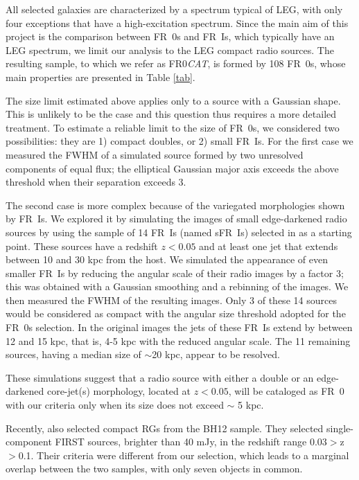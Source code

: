 \documentclass[traditabstract]{aa}
\newcommand{\FRo}{FR0{\sl{CAT}}}
\begin{document}
All selected galaxies are characterized by a spectrum typical of LEG,
with only four exceptions that have a high-excitation spectrum. Since
the main aim of this project is the comparison between FR~0s and
FR~Is, which typically have an LEG spectrum, we limit our analysis to
the LEG compact radio sources. The resulting sample, to which we refer
as \FRo, is formed by 108 FR~0s, whose main properties are presented
in Table \ref{tab}.


The size limit estimated above applies only to a source with a Gaussian shape.
This is unlikely to be the case and this question thus requires a more detailed
treatment. To estimate a reliable limit to the size of FR~0s, we
considered two possibilities: they are 1) compact doubles, or 2)
small FR~Is. For the first case we measured the FWHM of a simulated source
formed by two unresolved components of equal flux; the elliptical Gaussian
major axis exceeds the above threshold when their separation exceeds 3.

The second case is more complex because of the variegated morphologies
shown by FR~Is. We explored it by simulating the images of small
edge-darkened radio sources by using the sample of 14 FR~Is (named
sFR~Is) selected in \citet{capetti17a} as a starting point. These
sources have a redshift $z<0.05$ and at least one jet that extends
between 10 and 30 kpc from the host. We simulated the appearance of
even smaller FR~Is by reducing the angular scale of their radio images
by a factor 3; this was obtained with a Gaussian smoothing and a
rebinning of the images. We then measured the FWHM of the resulting
images. Only 3 of these 14 sources would be considered as compact with
the angular size threshold adopted for the FR~0s selection. In the
original images the jets of these FR~Is extend by between 12 and 15
kpc, that is, 4-5 kpc with the reduced angular scale. The 11 remaining
sources, having a median size of $\sim$20 kpc, appear to be resolved.

These simulations suggest that a radio source with either a double or
an edge-darkened core-jet(s) morphology, located at $z<0.05$, will be
cataloged as FR~0 with our criteria only when its size does not exceed
$\sim$ 5 kpc.

Recently, \citet{miraghaei17} also selected compact RGs from the BH12
sample.  They selected single-component FIRST sources, brighter than
40 mJy, in the redshift range 0.03$>$z$>$0.1. Their criteria were
different from our selection, which leads to a marginal overlap
between the two samples, with only seven objects in common.
\end{document}

